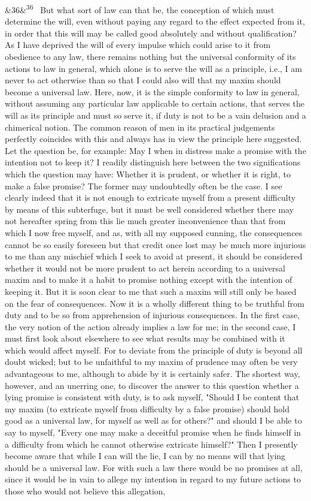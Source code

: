 \documentclass[12pt]{article}
\newcommand{\para}[1][]{\par\noindent\ifx&#1&\else\textsuperscript{\footnotesize #1}~\fi}
\begin{document}
\para[36] But what sort of law can that be, the conception of which must determine the will, even without paying any regard to the effect expected from it, in order that this will may be called good absolutely and without qualification? As I have deprived the will of every impulse which could arise to it from obedience to any law, there remains nothing but the universal conformity of its actions to law in general, which alone is to serve the will as a principle, i.e., I am never to act otherwise than so that I could also will that my maxim should become a universal law. Here, now, it is the simple conformity to law in general, without assuming any particular law applicable to certain actions, that serves the will as its principle and must so serve it, if duty is not to be a vain delusion and a chimerical notion. The common reason of men in its practical judgements perfectly coincides with this and always has in view the principle here suggested. Let the question be, for example: May I when in distress make a promise with the intention not to keep it? I readily distinguish here between the two significations which the question may have: Whether it is prudent, or whether it is right, to make a false promise? The former may undoubtedly often be the case. I see clearly indeed that it is not enough to extricate myself from a present difficulty by means of this subterfuge, but it must be well considered whether there may not hereafter spring from this lie much greater inconvenience than that from which I now free myself, and as, with all my supposed cunning, the consequences cannot be so easily foreseen but that credit once lost may be much more injurious to me than any mischief which I seek to avoid at present, it should be considered whether it would not be more prudent to act herein according to a universal maxim and to make it a habit to promise nothing except with the intention of keeping it. But it is soon clear to me that such a maxim will still only be based on the fear of consequences. Now it is a wholly different thing to be truthful from duty and to be so from apprehension of injurious consequences. In the first case, the very notion of the action already implies a law for me; in the second case, I must first look about elsewhere to see what results may be combined with it which would affect myself. For to deviate from the principle of duty is beyond all doubt wicked; but to be unfaithful to my maxim of prudence may often be very advantageous to me, although to abide by it is certainly safer. The shortest way, however, and an unerring one, to discover the answer to this question whether a lying promise is consistent with duty, is to ask myself, "Should I be content that my maxim (to extricate myself from difficulty by a false promise) should hold good as a universal law, for myself as well as for others?" and should I be able to say to myself, "Every one may make a deceitful promise when he finds himself in a difficulty from which he cannot otherwise extricate himself?" Then I presently become aware that while I can will the lie, I can by no means will that lying should be a universal law. For with such a law there would be no promises at all, since it would be in vain to allege my intention in regard to my future actions to those who would not believe this allegation, 
\end{document}
